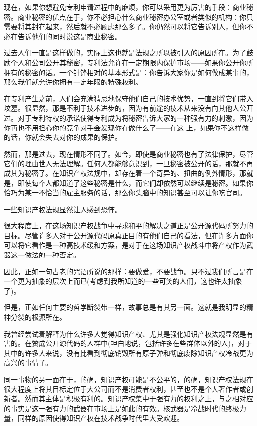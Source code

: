 现在，如果你想避免专利申请过程中的麻烦，你可以采用更为厉害的手段：商业秘密。商业秘密的优点在于，你不必担心什么商业秘密办公室或者类似的机构：你只需要将其封存起来，然后就不必顾虑那么多了。你仍然可以将它告诉别人，但你不必在告诉他们的同时说这是商业秘密。

过去人们一直是这样做的，实际上这也就是法规之所以被引入的原因所在。为了鼓励个人和公司公开其秘密，专利法允许在一定期限内保护市场——如果你公开你所拥有的秘密的话。一个针锋相对的基本形式是：你告诉大家你是如何做成某事的，那么我们就允许你拥有一定年限的特殊权利。

在专利产生之前，人们会充满猜忌地保守他们自己的技术优势，一直到将它们带入坟墓。很显然，那是不利于技术进步的，因为有前途的技术从来没有向其他人公开过。对于专利特权的承诺使得专利成为将秘密告诉大家的一种强有力的刺激，因为你再也不用担心你的竞争对手会发现你在做什么了——在这 上，如果你不这样做的话，你就会失去对你的成果的保护。

然而，那是过去，现在情形不同了。如今，即使是商业秘密也有了法律保护，尽管它们的理由世人无法理解。任何人都能够意识到，一旦秘密被公开的话，那就不再成其为秘密了。在知识产权法规中，却存在着一个奇异的、扭曲的例外情形，那就是，即使每个人都知道了这些秘密是什么，而它们却依然可以继续是秘密。如果你恰巧为某一不恰当的雇主服务的话，那么你头脑中的知识甚至可以让你吃官司。

一些知识产权法规显然让人感到恐怖。

很大程度上，在这场知识产权战争中寻求和平的解决之道正是公开源代码所努力的目标。尽管许多人对于公开源代码原真正目的有他们自己的看法，但在许多方面你可以将它看作是一种高技术缓和方案，是对于在这场知识产权战斗中将产权作为武器这一做法的一种否定。

因此，正如一句古老的咒语所说的那样：要做爱，不要战争。只不过我们所言是在一个更为抽象的层次上而已(考虑到我所知道的一些可笑的人们，这也许太抽象了)。

但是，正如任何主要的哲学断裂带一样，故事总是有其另一面。这就是我明显的精神分裂的根源所在。

我曾经尝试着解释为什么许多人觉得知识产权、尤其是强化知识产权法规显然是有害的。在赞成公开源代码的人群中(坦白地说，包括许多在些群体以外的人)，对于其中的许多人来说，没有比看到彻底销毁所有原子弹和彻底废除知识产权冷战更为高兴的事情了。

同一事物的另一面在于，的确，知识产权可能是不公平的，的确，知识产权法规在很大程度上将其目标定位于大公司而不是消费者权利，甚至也不是个人著作者或创新者。然而其主体是积极有利的。知识产权集中于强有力的权利之上，与之相对应的事实是这一强有力的武器在市场上是如此的有效。核武器是冷战时代的终极力量，同样的原因使得知识产权在技术战争时代里大受欢迎。

